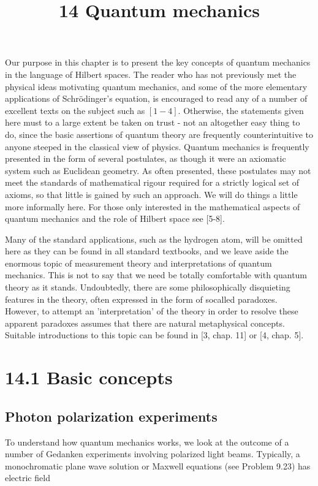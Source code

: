 \documentclass[10pt]{article}
\title{14 Quantum mechanics }
\author{}
\date{}
\begin{document}
\maketitle
Our purpose in this chapter is to present the key concepts of quantum mechanics in the language of Hilbert spaces. The reader who has not previously met the physical ideas motivating quantum mechanics, and some of the more elementary applications of Schrödinger's equation, is encouraged to read any of a number of excellent texts on the subject such as $[1-4]$. Otherwise, the statements given here must to a large extent be taken on trust - not an altogether easy thing to do, since the basic assertions of quantum theory are frequently counterintuitive to anyone steeped in the classical view of physics. Quantum mechanics is frequently presented in the form of several postulates, as though it were an axiomatic system such as Euclidean geometry. As often presented, these postulates may not meet the standards of mathematical rigour required for a strictly logical set of axioms, so that little is gained by such an approach. We will do things a little more informally here. For those only interested in the mathematical aspects of quantum mechanics and the role of Hilbert space see [5-8].

Many of the standard applications, such as the hydrogen atom, will be omitted here as they can be found in all standard textbooks, and we leave aside the enormous topic of measurement theory and interpretations of quantum mechanics. This is not to say that we need be totally comfortable with quantum theory as it stands. Undoubtedly, there are some philosophically disquieting features in the theory, often expressed in the form of socalled paradoxes. However, to attempt an 'interpretation' of the theory in order to resolve these apparent paradoxes assumes that there are natural metaphysical concepts. Suitable introductions to this topic can be found in [3, chap. 11] or [4, chap. 5].

\section{14.1 Basic concepts}
\subsection{Photon polarization experiments}
To understand how quantum mechanics works, we look at the outcome of a number of Gedanken experiments involving polarized light beams. Typically, a monochromatic plane wave solution or Maxwell equations (see Problem 9.23) has electric field
\end{document}
